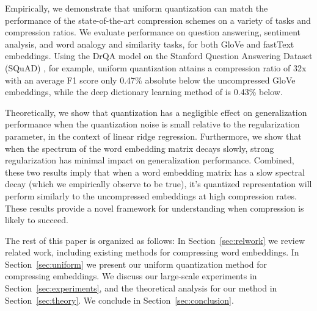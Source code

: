 Empirically, we demonstrate that uniform quantization can match the performance of the state-of-the-art compression schemes on a variety of tasks and compression ratios.
We evaluate performance on question answering, sentiment analysis, and word analogy and similarity tasks, for both GloVe \citep{glove14} and fastText \citep{fasttext18} embeddings.
Using the DrQA model \citep{drqa17} on the Stanford Question Answering Dataset (SQuAD) \citep{squad16}, for example, uniform quantization attains a compression ratio of 32x with an average F1 score only 0.47\% absolute below the uncompressed GloVe embeddings, while the deep dictionary learning method of \citet{dccl17} is 0.43\% below.

Theoretically, we show that quantization has a negligible effect on generalization performance when the quantization noise is small relative to the regularization parameter, in the context of linear ridge regression.
Furthermore, we show that when the spectrum of the word embedding matrix decays slowly, strong regularization has minimal impact on generalization performance.
Combined, these two results imply that when a word embedding matrix has a slow spectral decay (which we empirically observe to be true), it's quantized representation will perform similarly to the uncompressed embeddings at high compression rates.
These results provide a novel framework for understanding when compression is likely to succeed.

The rest of this paper is organized as follows:
In Section~\ref{sec:relwork} we review related work, including existing methods for compressing word embeddings.
In Section~\ref{sec:uniform} we present our uniform quantization method for compressing embeddings.
We discuss our large-scale experiments in Section~\ref{sec:experiments}, and the theoretical analysis for our method in Section~\ref{sec:theory}.
We conclude in Section~\ref{sec:conclusion}.


